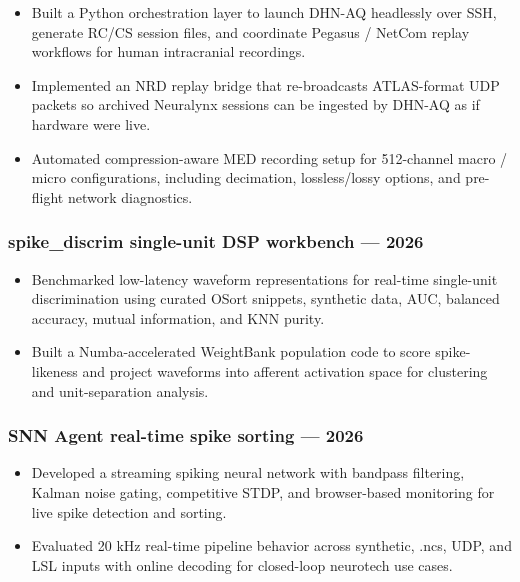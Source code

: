 \documentclass[11pt]{article}
\begin{document}
\begin{itemize}
\item Built a Python orchestration layer to launch DHN-AQ headlessly over SSH, generate RC/CS session files, and coordinate Pegasus / NetCom replay workflows for human intracranial recordings.
\item Implemented an NRD replay bridge that re-broadcasts ATLAS-format UDP packets so archived Neuralynx sessions can be ingested by DHN-AQ as if hardware were live.
\item Automated compression-aware MED recording setup for 512-channel macro / micro configurations, including decimation, lossless/lossy options, and pre-flight network diagnostics.
\end{itemize}

\subsubsection{spike\_discrim single-unit DSP workbench ---
2026}\label{spike_discrim-single-unit-dsp-workbench-2026}

\begin{itemize}
\item Benchmarked low-latency waveform representations for real-time single-unit discrimination using curated OSort snippets, synthetic data, AUC, balanced accuracy, mutual information, and KNN purity.
\item Built a Numba-accelerated WeightBank population code to score spike-likeness and project waveforms into afferent activation space for clustering and unit-separation analysis.
\end{itemize}

\subsubsection{SNN Agent real-time spike sorting ---
2026}\label{snn-agent-real-time-spike-sorting-2026}

\begin{itemize}
\item Developed a streaming spiking neural network with bandpass filtering, Kalman noise gating, competitive STDP, and browser-based monitoring for live spike detection and sorting.
\item Evaluated 20 kHz real-time pipeline behavior across synthetic, .ncs, UDP, and LSL inputs with online decoding for closed-loop neurotech use cases.
\end{itemize}
\end{document}
